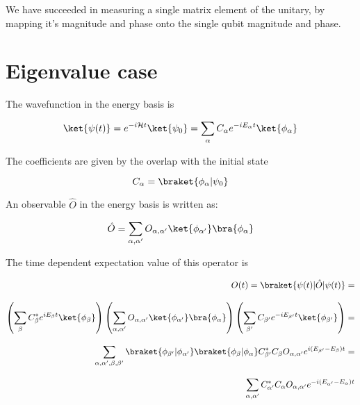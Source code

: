 We have succeeded in measuring a single matrix element of the unitary, by mapping it's magnitude and phase onto the single qubit magnitude and phase.



\section{Eigenvalue case}

The wavefunction in the energy basis is

\begin{equation}
    \ket{\psi (t)} =e^{-i \mathcal{H} t} \ket{\psi_{0}} = \sum_{\alpha} C_{\alpha} e^{- i E_{\alpha} t} \ket{\phi_{\alpha}}
\end{equation}

The coefficients are given by the overlap with the initial state

\begin{equation}
    C_{\alpha} = \braket{\phi_{\alpha}|\psi_{0}}
\end{equation}

An observable $\hat{O}$ in the energy basis is written as:


\begin{equation}
    \hat{O} = \sum_{\alpha,\alpha^{\prime}} O_{\alpha,\alpha^{\prime}} \ket{\phi_{\alpha^{\prime}}} \bra{\phi_{\alpha}}
\end{equation}

The time dependent expectation value of this operator is

\begin{equation*}
    \begin{aligned}
        O(t) =\braket{\psi(t)|\hat{O}|\psi(t)} = \\[2.0ex]
        \left( \sum_{\beta} C^{*}_{\beta} e^{i E_{\beta} t} \ket{\phi_{\beta}} \right)
        \left( \sum_{\alpha,\alpha^{\prime}} O_{\alpha,\alpha^{\prime}} \ket{\phi_{\alpha^{\prime}}} \bra{\phi_{\alpha}} \right)
        \left( \sum_{\beta^{\prime}} C_{\beta^{\prime}} e^{- i E_{\beta^{\prime}} t} \ket{\phi_{\beta^{\prime}}} \right) = \\[2.0ex]
        \sum_{\alpha, \alpha^{\prime}, \beta, \beta^{\prime} }
        \braket{\phi_{\beta^{\prime}}|\phi_{\alpha^{\prime}}}
        \braket{\phi_{\beta}|\phi_{\alpha}}
        C_{\beta^{\prime}}^{*} C_{\beta} O_{\alpha, \alpha^{\prime}} e^{i (E_{\beta^\prime} - E_{\beta}) t} = \\[2.0ex]
        \sum_{\alpha, \alpha^{\prime}} C^{*}_{\alpha^{\prime}} C_{\alpha} O_{\alpha, \alpha^{\prime}} e^{- i (E_{\alpha^{\prime}} - E_{\alpha}) t}
    \end{aligned}
\end{equation*}

